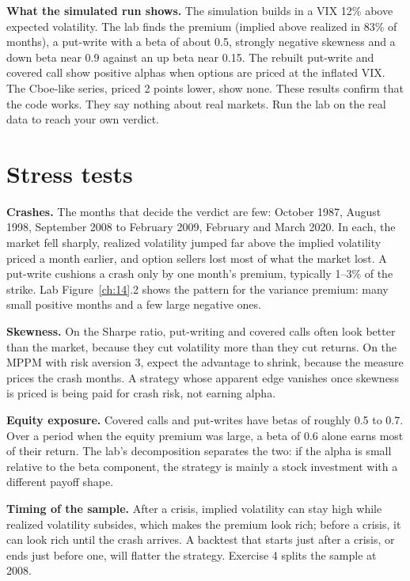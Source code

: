 \textbf{What the simulated run shows.} The simulation builds in a VIX 12\% above expected volatility. The lab finds the premium (implied above realized in 83\% of months), a put-write with a beta of about 0.5, strongly negative skewness and a down beta near 0.9 against an up beta near 0.15. The rebuilt put-write and covered call show positive alphas when options are priced at the inflated VIX. The Cboe-like series, priced 2 points lower, show none. These results confirm that the code works. They say nothing about real markets. Run the lab on the real data to reach your own verdict.

\section{Stress tests}
\label{sec:14-stress}

\textbf{Crashes.} The months that decide the verdict are few: October 1987, August 1998, September 2008 to February 2009, February and March 2020. In each, the market fell sharply, realized volatility jumped far above the implied volatility priced a month earlier, and option sellers lost most of what the market lost. A put-write cushions a crash only by one month's premium, typically 1--3\% of the strike. Lab Figure~\ref{ch:14}.2 shows the pattern for the variance premium: many small positive months and a few large negative ones.

\textbf{Skewness.} On the Sharpe ratio, put-writing and covered calls often look better than the market, because they cut volatility more than they cut returns. On the MPPM with risk aversion 3, expect the advantage to shrink, because the measure prices the crash months. A strategy whose apparent edge vanishes once skewness is priced is being paid for crash risk, not earning alpha.

\textbf{Equity exposure.} Covered calls and put-writes have betas of roughly 0.5 to 0.7. Over a period when the equity premium was large, a beta of 0.6 alone earns most of their return. The lab's decomposition separates the two: if the alpha is small relative to the beta component, the strategy is mainly a stock investment with a different payoff shape.

\textbf{Timing of the sample.} After a crisis, implied volatility can stay high while realized volatility subsides, which makes the premium look rich; before a crisis, it can look rich until the crash arrives. A backtest that starts just after a crisis, or ends just before one, will flatter the strategy. Exercise 4 splits the sample at 2008.

